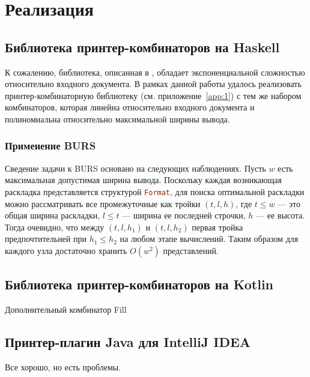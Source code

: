\section{Реализация}

\subsection{Библиотека принтер-комбинаторов на Haskell}
К сожалению, библиотека, описанная в \cite{swierstra}, обладает экспоненциальной
сложностью относительно входного документа. В рамках данной работы удалось реализовать
принтер-комбинаторную библиотеку (см. приложение~\ref{app:1}) с тем же набором комбинаторов,
которая линейна относительно входного документа и полиномиальна
относительно максимальной ширины вывода.


\subsubsection{Применение BURS}
Сведение задачи к BURS основано на следующих наблюдениях. Пусть $w$ есть максимальная допустимая
ширина вывода. Поскольку каждая возникающая раскладка представляется структурой
\lstinline[language=Haskell]{Format}, для поиска оптимальной раскладки можно рассматривать
все промежуточные как тройки $(t, l, h)$, где $t \le w$ --- это общая ширина раскладки, $l \le t$ ---
ширина ее последней строчки, $h$ --- ее высота. Тогда очевидно, что между $(t, l, h_1)$ и
$(t, l, h_2)$ первая тройка предпочтительней при $h_1 \le h_2$ на любом этапе вычислений.
Таким образом для каждого узла достаточно хранить $O(w^2)$ представлений.

\subsection{Библиотека принтер-комбинаторов на Kotlin}
Дополнительный комбинатор Fill

\subsection{Принтер-плагин Java для IntelliJ IDEA}

Все хорошо, но есть проблемы.

